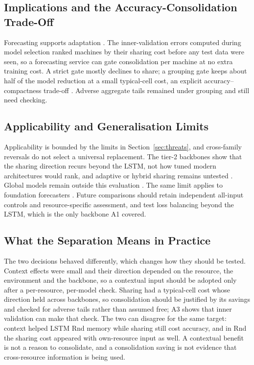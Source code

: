 \documentclass[5p,twocolumn]{elsarticle}
\begin{document}
\subsection{Implications and the Accuracy-Consolidation Trade-Off}
\label{sec:discussion-systems}
\label{sec:discussion-efficiency}

Forecasting supports adaptation
\citep{Taherizadeh2018Monitoring,Bauer2020SelfAware}. The inner-validation
errors computed during model selection ranked machines by their sharing cost
before any
test data were seen, so a forecasting service can gate consolidation per
machine at no extra training cost. A strict gate mostly declines to share; a
grouping gate keeps about half of the model reduction at a small typical-cell
cost, an explicit accuracy--compactness trade-off
\citep{Standley2020TaskGrouping,Syu2017DynamicQoS}. Adverse aggregate tails
remained under grouping and still need checking.

\subsection{Applicability and Generalisation Limits}
\label{sec:discussion-applicability}

Applicability is bounded by the limits in Section~\ref{sec:threats}, and
cross-family reversals do not select a universal replacement. The tier-2
backbones show that the sharing direction recurs beyond the LSTM, not how
tuned modern architectures would rank, and adaptive or hybrid sharing remains
untested \citep{Yu2020GradientSurgery,Nochumsohn2025MTLinear}.
Global models remain outside this evaluation
\citep{MonteroManso2021GlobalForecasting}.
The same limit applies to foundation forecasters
\citep{DiMenna2026RuntimeForecasting}. Future comparisons should retain
independent all-input controls and resource-specific assessment, and test
loss balancing beyond the LSTM, which is the only backbone A1 covered.

\subsection{What the Separation Means in Practice}
\label{sec:discussion-separability}

The two decisions behaved differently, which changes how they should be
tested. Context effects were small and their direction depended on the
resource, the environment and the backbone, so a contextual input should be
adopted only after a per-resource, per-model check. Sharing had a
typical-cell cost whose direction held across backbones, so consolidation
should be justified by its savings and checked for adverse tails rather than
assumed free; A3 shows that inner validation can make that check. The two can
disagree for the same target:
context helped LSTM Rnd memory while sharing still cost accuracy, and in Rnd
the sharing cost appeared with own-resource input as well. A contextual
benefit is not a reason to consolidate, and a consolidation saving is not
evidence that
cross-resource information is being used.
\end{document}
